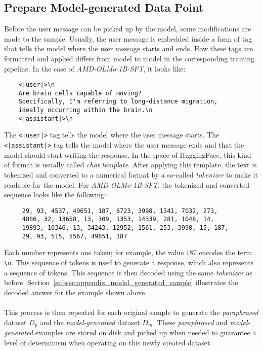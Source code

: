 \subsection{Prepare Model-generated Data Point}\label{subsec:prepare_model_input}
Before the user message can be picked up by the model, some modifications are made to the sample. Usually, the user message is embedded inside a form of tag that tells the model where the user message starts and ends. How these tags are formatted and applied differs from model to model in the corresponding training pipeline. In the case of \emph{AMD-OLMo-1B-SFT}, it looks like:
\begin{verbatim}
    <|user|>\n
    Are brain cells capable of moving? 
    Specifically, I'm referring to long-distance migration, 
    ideally occurring within the brain.\n
    <|assistant|>\n
\end{verbatim}
The \texttt{<|user|>} tag tells the model where the user message starts. The \texttt{<|assistant|>} tag tells the model where the user message ends and that the model should start writing the response. In the space of HuggingFace, this kind of format is usually called \emph{chat template}. After applying this template, the text is tokenized and converted to a numerical format by a so-called \emph{tokenizer} to make it readable for the model. For \emph{AMD-OLMo-1B-SFT}, the tokenized and converted sequence looks like the following:
\begin{verbatim}
     29, 93, 4537, 49651, 187, 6723, 3998, 1341, 7032, 273,
     4886, 32, 13658, 13, 309, 1353, 14339, 281, 1048, 14,
     19893, 10346, 13, 34243, 12952, 1561, 253, 3998, 15, 187,
     29, 93, 515, 5567, 49651, 187
\end{verbatim}
Each number represents one token; for example, the value $187$ encodes the term \texttt{\textbackslash n}. This sequence of tokens is used to generate a response, which also represents a sequence of tokens. This sequence is then decoded using the same \emph{tokenizer} as before. Section~\ref{subsec:appendix_model_generated_sample} illustrates the decoded answer for the example shown above.
\\\\
This process is then repeated for each original sample to generate the \emph{paraphrased} dataset $D_p$ and the \emph{model-generated} dataset $D_m$. These \emph{paraphrased} and \emph{model-generated} examples are stored on disk and picked up when needed to guarantee a level of determinism when operating on this newly created dataset. 

